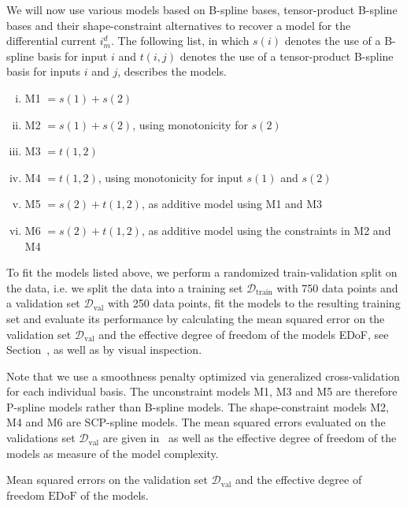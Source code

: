 We will now use various models based on B-spline bases, tensor-product B-spline bases and their shape-constraint alternatives to recover a model for the differential current $i_m^d$. The following list, in which $s(i)$ denotes the use of a B-spline basis for input $i$ and $t(i,j)$ denotes the use of a tensor-product B-spline basis for inputs $i$ and $j$, describes the models.

\begin{enumerate}[(i)]
	\item M1 $= s(1) + s(2)$
	\item M2 $= s(1) + s(2)$, using monotonicity for $s(2)$
	\item M3 $= t(1,2)$
	\item M4 $= t(1,2)$, using monotonicity for input $s(1)$ and $s(2)$
	\item M5 $= s(2) + t(1,2)$, as additive model using M1 and M3
	\item M6 $= s(2) + t(1,2)$, as additive model using the constraints in M2 and M4
\end{enumerate}
%
To fit the models listed above, we perform a randomized train-validation split on the data, i.e. we split the data into a training set $\mathcal{D}_{\text{train}}$ with 750 data points and a validation set $\mathcal{D}_{\text{val}}$ with 250 data points, fit the models to the resulting training set and evaluate its performance by calculating the mean squared error on the validation set $\mathcal{D}_{\text{val}}$ and the effective degree of freedom of the models EDoF, see Section~, as well as by visual inspection.

Note that we use a smoothness penalty optimized via generalized cross-validation for each individual basis. The unconstraint models M1, M3 and M5 are therefore P-spline models rather than B-spline models. The shape-constraint models M2, M4 and M6 are SCP-spline models. The mean squared errors evaluated on the validations set $\mathcal{D}_{\text{val}}$ are given in~ as well as the effective degree of freedom of the models as measure of the model complexity. 

\begin{table}[H]
	\begin{center}
	\end{center}
	\caption{Mean squared errors on the validation set $\mathcal{D}_{\text{val}}$ and the effective degree of freedom $\text{EDoF}$ of the models.}
	\label{tab:bosch-mse-val}
\end{table}

